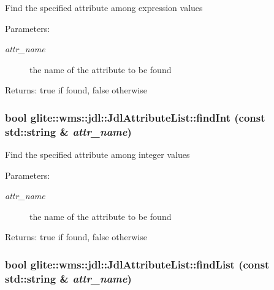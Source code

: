 Find the specified attribute among expression values \begin{Desc}
\item[Parameters:]
\begin{description}
\item[{\em attr\_\-name}]the name of the attribute to be found \end{description}
\end{Desc}
\begin{Desc}
\item[Returns:]true if found, false otherwise \end{Desc}
\hypertarget{classglite_1_1wms_1_1jdl_1_1JdlAttributeList_a3}{
\subsubsection[findInt]{\setlength{\rightskip}{0pt plus 5cm}bool glite::wms::jdl::Jdl\-Attribute\-List::find\-Int (const std::string \& {\em attr\_\-name})}}
\label{classglite_1_1wms_1_1jdl_1_1JdlAttributeList_a3}


Find the specified attribute among integer values \begin{Desc}
\item[Parameters:]
\begin{description}
\item[{\em attr\_\-name}]the name of the attribute to be found \end{description}
\end{Desc}
\begin{Desc}
\item[Returns:]true if found, false otherwise \end{Desc}
\hypertarget{classglite_1_1wms_1_1jdl_1_1JdlAttributeList_a7}{
\subsubsection[findList]{\setlength{\rightskip}{0pt plus 5cm}bool glite::wms::jdl::Jdl\-Attribute\-List::find\-List (const std::string \& {\em attr\_\-name})}}
\label{classglite_1_1wms_1_1jdl_1_1JdlAttributeList_a7}



